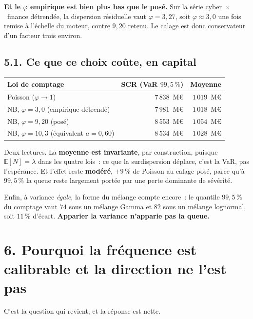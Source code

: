 \documentclass[11pt,a4paper]{article}
\begin{document}
\medskip
\noindent\textbf{Et le $\varphi$ empirique est bien plus bas que le posé.} Sur la série
cyber~$\times$~finance détrendée, la dispersion résiduelle vaut $\varphi=3{,}27$, soit
$\varphi\approx3{,}0$ une fois remise à l'échelle du moteur, contre $9{,}20$ retenu. Le
calage est donc conservateur d'un facteur trois environ.

\subsection*{5.1. Ce que ce choix coûte, en capital}

\begin{center}\small
\begin{tabular}{@{}l r r@{}}
\toprule
\textbf{Loi de comptage} & \textbf{SCR (VaR $99{,}5\,\%$)} & \textbf{Moyenne} \\
\midrule
Poisson ($\varphi\to1$) & $7\,838$~M\euro & $1\,019$~M\euro \\
NB, $\varphi=3{,}0$ (empirique détrendé) & $7\,981$~M\euro & $1\,018$~M\euro \\
NB, $\varphi=9{,}20$ (posé) & $8\,553$~M\euro & $1\,054$~M\euro \\
NB, $\varphi=10{,}3$ (équivalent $a=0{,}60$) & $8\,534$~M\euro & $1\,028$~M\euro \\
\bottomrule
\end{tabular}
\end{center}

\medskip
Deux lectures. La \textbf{moyenne est invariante}, par construction, puisque
$\mathbb{E}[N]=\lambda$ dans les quatre lois~: ce que la surdispersion déplace, c'est la
VaR, pas l'espérance. Et l'effet reste \textbf{modéré}, $+9\,\%$ de Poisson au calage posé,
parce qu'à $99{,}5\,\%$ la queue reste largement portée par une perte dominante de sévérité.

Enfin, à variance \emph{égale}, la forme du mélange compte encore~: le quantile
$99{,}5\,\%$ du comptage vaut $74$ sous un mélange Gamma et $82$ sous un mélange lognormal,
soit $11\,\%$ d'écart. \textbf{Apparier la variance n'apparie pas la queue.}

\section*{6. Pourquoi la fréquence est calibrable et la direction ne l'est pas}

C'est la question qui revient, et la réponse est nette.
\end{document}
